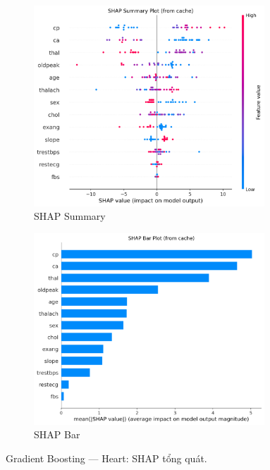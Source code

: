 \begin{figure}[H]
\centering
\begin{subfigure}[b]{0.48\textwidth}\centering
\includegraphics[width=0.95\textwidth]{Result/heart_dataset/GB/SHAP/Summary.png}
\caption{SHAP Summary}\label{fig:gb_heart_shap_summary}
\end{subfigure}\hfill
\begin{subfigure}[b]{0.48\textwidth}\centering
\includegraphics[width=0.95\textwidth]{Result/heart_dataset/GB/SHAP/Bar.png}
\caption{SHAP Bar}\label{fig:gb_heart_shap_bar}
\end{subfigure}
\caption{Gradient Boosting — Heart: SHAP tổng quát.}
\label{fig:gb_heart_shap_overview}
\end{figure}

